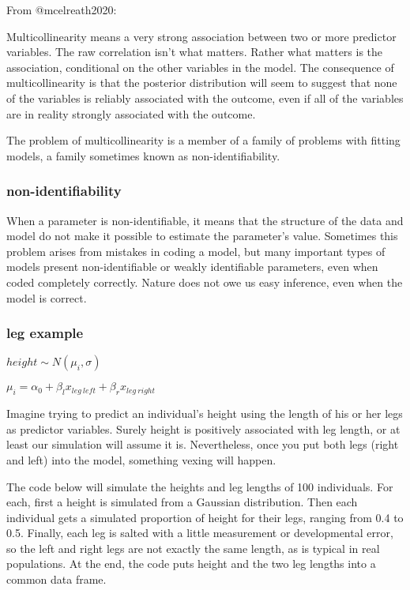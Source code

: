 \documentclass[
]{article}
\begin{document}
From @mcelreath2020:

Multicollinearity means a very strong association between two or more
predictor variables. The raw correlation isn't what matters. Rather what
matters is the association, conditional on the other variables in the
model. The consequence of multicollinearity is that the posterior
distribution will seem to suggest that none of the variables is reliably
associated with the outcome, even if all of the variables are in reality
strongly associated with the outcome.

The problem of multicollinearity is a member of a family of problems
with fitting models, a family sometimes known as non-identifiability.

\hypertarget{non-identifiability}{%
\subsubsection{\texorpdfstring{\textbf{non-identifiability}}{non-identifiability}}\label{non-identifiability}}

When a parameter is non-identifiable, it means that the structure of the
data and model do not make it possible to estimate the parameter's
value. Sometimes this problem arises from mistakes in coding a model,
but many important types of models present non-identifiable or weakly
identifiable parameters, even when coded completely correctly. Nature
does not owe us easy inference, even when the model is correct.

\hypertarget{leg-example}{%
\subsubsection{leg example}\label{leg-example}}

\(height \sim N(\mu_i, \sigma)\)

\(\mu_i = \alpha_{0} + \beta_{l} x_{leg\:left}+ \beta_{r} x_{leg\:right}\)

Imagine trying to predict an individual's height using the length of his
or her legs as predictor variables. Surely height is positively
associated with leg length, or at least our simulation will assume it
is. Nevertheless, once you put both legs (right and left) into the
model, something vexing will happen.

The code below will simulate the heights and leg lengths of 100
individuals. For each, first a height is simulated from a Gaussian
distribution. Then each individual gets a simulated proportion of height
for their legs, ranging from 0.4 to 0.5. Finally, each leg is salted
with a little measurement or developmental error, so the left and right
legs are not exactly the same length, as is typical in real populations.
At the end, the code puts height and the two leg lengths into a common
data frame.
\end{document}

